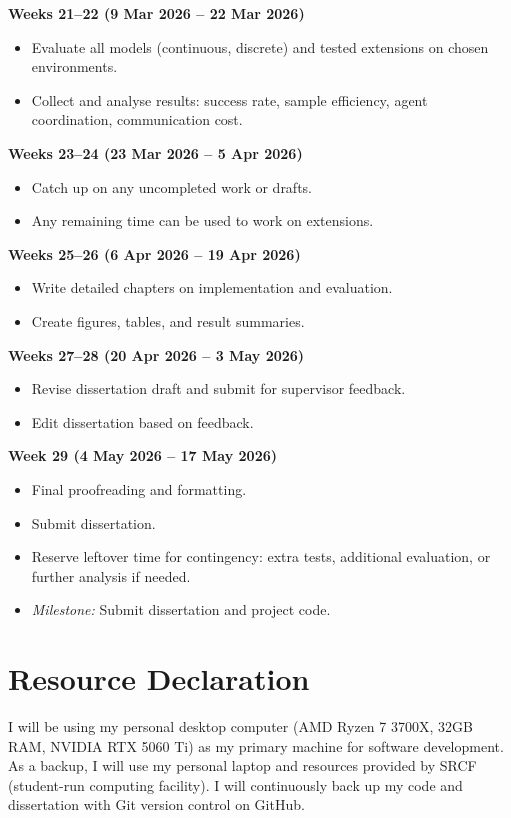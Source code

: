 \documentclass[20pt]{article}
\begin{document}
\begin{list}{}{\leftmargin=0cm \itemindent=0cm}
\item \textbf{Weeks 21--22 (9 Mar 2026 -- 22 Mar 2026)}
\begin{itemize}
\item Evaluate all models (continuous, discrete) and tested extensions on chosen environments.
\item Collect and analyse results: success rate, sample efficiency, agent coordination, communication cost.
\end{itemize}

\item \textbf{Weeks 23--24 (23 Mar 2026 -- 5 Apr 2026)}
\begin{itemize}
\item Catch up on any uncompleted work or drafts.
\item Any remaining time can be used to work on extensions.
\end{itemize}

\item \textbf{Weeks 25--26 (6 Apr 2026 -- 19 Apr 2026)}
\begin{itemize}
\item Write detailed chapters on implementation and evaluation.
\item Create figures, tables, and result summaries.
\end{itemize}

\item \textbf{Weeks 27--28 (20 Apr 2026 -- 3 May 2026)}
\begin{itemize}
\item Revise dissertation draft and submit for supervisor feedback.
\item Edit dissertation based on feedback.
\end{itemize}

\item \textbf{Week 29 (4 May 2026 -- 17 May 2026)}
\begin{itemize}
\item Final proofreading and formatting.
\item Submit dissertation.
\item Reserve leftover time for contingency: extra tests, additional evaluation, or further analysis if needed.
\item \textit{Milestone:} Submit dissertation and project code.
\end{itemize}

\end{list}

\section{Resource Declaration}

I will be using my personal desktop computer (AMD Ryzen 7 3700X, 32GB RAM, NVIDIA RTX 5060 Ti) as my primary
machine for software development. As a backup, I will use my personal laptop and resources provided by SRCF (student-run computing facility). I will continuously back up my code and dissertation with Git version control on GitHub.

\pagebreak

\printbibliography
\end{document}
